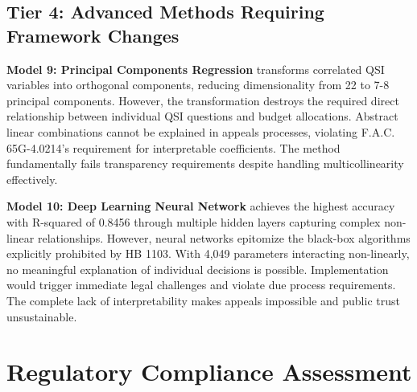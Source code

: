 \subsection{Tier 4: Advanced Methods Requiring Framework Changes}

\textbf{Model 9: Principal Components Regression} transforms correlated QSI variables into orthogonal components, reducing dimensionality from 22 to 7-8 principal components. However, the transformation destroys the required direct relationship between individual QSI questions and budget allocations. Abstract linear combinations cannot be explained in appeals processes, violating F.A.C. 65G-4.0214's requirement for interpretable coefficients. The method fundamentally fails transparency requirements despite handling multicollinearity effectively.

\textbf{Model 10: Deep Learning Neural Network} achieves the highest accuracy with R-squared of 0.8456 through multiple hidden layers capturing complex non-linear relationships. However, neural networks epitomize the black-box algorithms explicitly prohibited by HB 1103. With 4,049 parameters interacting non-linearly, no meaningful explanation of individual decisions is possible. Implementation would trigger immediate legal challenges and violate due process requirements. The complete lack of interpretability makes appeals impossible and public trust unsustainable.

\section{Regulatory Compliance Assessment}

